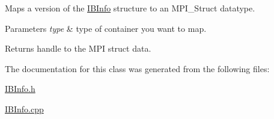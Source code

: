 Maps a version of the \hyperlink{class_i_b_info}{I\+B\+Info} structure to an M\+P\+I\+\_\+\+Struct datatype. 


\begin{DoxyParams}{Parameters}
{\em type} & type of container you want to map. \\
\hline
\end{DoxyParams}
\begin{DoxyReturn}{Returns}
handle to the M\+PI struct data. 
\end{DoxyReturn}


The documentation for this class was generated from the following files\+:\begin{DoxyCompactItemize}
\item 
\hyperlink{_i_b_info_8h}{I\+B\+Info.\+h}\item 
\hyperlink{_i_b_info_8cpp}{I\+B\+Info.\+cpp}\end{DoxyCompactItemize}
